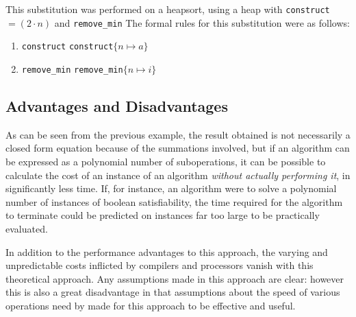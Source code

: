 \par
\bigskip

This substitution was performed on a heapsort, using a heap with \texttt{construct} $ = (2 \cdot n)$ and \texttt{remove_min} 
The formal rules for this substitution were as follows:

\begin{enumerate}

\item \texttt{construct} \rightarrow \texttt{construct}$\{n \mapsto a\}$

\item \texttt{remove_min} \rightarrow \texttt{remove_min}$\{n \mapsto i\}$

\end{enumerate}

\subsection{Advantages and Disadvantages}

As can be seen from the previous example, the result obtained is not necessarily a closed form equation because of the summations involved, but if an algorithm can be expressed as a polynomial number of suboperations, it can be possible to calculate the cost of an instance of an algorithm \textit{without actually performing it}, in significantly less time.  If, for instance, an algorithm were to solve a polynomial number of instances of boolean satisfiability, the time required for the algorithm to terminate could be predicted on instances far too large to be practically evaluated.

In addition to the performance advantages to this approach, the varying and unpredictable costs inflicted by compilers and processors vanish with this theoretical approach.  Any assumptions made in this approach are clear: however this is also a great disadvantage in that assumptions about the speed of various operations need by made for this approach to be effective and useful.


